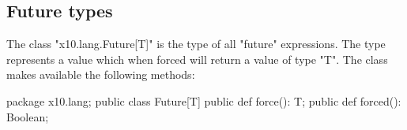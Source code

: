 \subsection{Future types}

The class \xcd"x10.lang.Future[T]"
is the type of all \xcd"future" expressions.
The type represents a value which when forced will return a value of type
\xcd"T". The class makes available the following methods:

\begin{xten}
package x10.lang;
public class Future[T] {
  public def force(): T;
  public def forced(): Boolean;
}
\end{xten}
  
